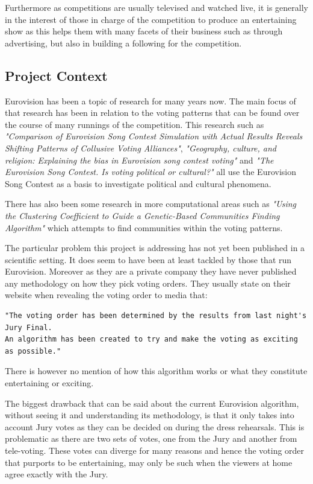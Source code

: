\documentclass[12pt]{report}
\begin{document}
Furthermore as competitions are usually televised and watched live, it is generally in the interest of those in charge of the competition to produce an entertaining show as this helps them with many facets of their business such as through advertising, but also in building a following for the competition.

\subsection{Project Context}\label{Project Context}
Eurovision has been a topic of research for many years now. The main focus of that research has been in relation to the voting patterns that can be found over the course of many runnings of the competition. This research such as \textit{"Comparison of Eurovision Song Contest Simulation with Actual Results Reveals Shifting Patterns of Collusive Voting Alliances"}\cite{gatherer2006}, \textit{"Geography, culture, and religion: Explaining the bias in Eurovision song contest voting"}\cite{so66198} and \textit{"The Eurovision Song Contest. Is voting political or cultural?"} \cite{Ginsburgh200841} all use the Eurovision Song Contest as a basis to investigate political and cultural phenomena.

There has also been some research in more computational areas such as \textit{"Using the Clustering Coefficient to Guide a Genetic-Based Communities Finding Algorithm"}\cite{Bello2011} which attempts to find communities within the voting patterns.

The particular problem this project is addressing has not yet been published in a scientific setting. It does seem to have been at least tackled by those that run Eurovision. Moreover as they are a private company they have never published any methodology on how they pick voting orders. They usually state on their website\cite{votingOrderQuote} when revealing the voting order to media that:
\begin{verbatim}"The voting order has been determined by the results from last night's Jury Final.
An algorithm has been created to try and make the voting as exciting as possible."
\end{verbatim}
There is however no mention of how this algorithm works or what they constitute entertaining or exciting.

The biggest drawback that can be said about the current Eurovision algorithm, without seeing it and understanding its methodology, is that it only takes into account Jury votes as they can be decided on during the dress rehearsals. This is problematic as there are two sets of votes, one from the Jury and another from tele-voting. These votes can diverge for many reasons and hence the voting order that purports to be entertaining, may only be such when the viewers at home agree exactly with the Jury.
\end{document}
